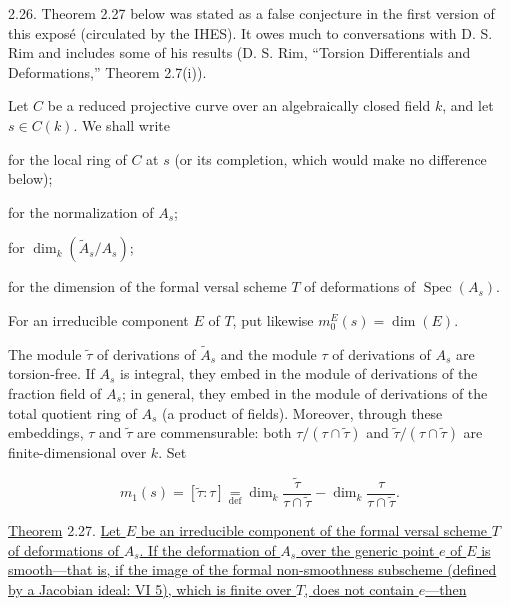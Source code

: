 2.26. Theorem 2.27 below was stated as a false conjecture in the first version
of this exposé (circulated by the IHES).  It owes much to conversations with
D. S. Rim and includes some of his results (D. S. Rim, ``Torsion
Differentials and Deformations,'' Theorem 2.7(i)).


Let $C$ be a reduced projective curve over an algebraically closed field $k$,
and let $s\in C(k)$.  We shall write

\begin{description}[leftmargin=2.7cm,style=nextline]
\item[$A_s$] for the local ring of $C$ at $s$ (or its completion, which would
make no difference below);
\item[$\widetilde A_s$] for the normalization of $A_s$;
\item[$\delta(s)$] for $\dim_k(\widetilde A_s/A_s)$;
\item[$m_0(s)$] for the dimension of the formal versal scheme $T$ of
deformations of $\operatorname{Spec}(A_s)$.
\end{description}

For an irreducible component $E$ of $T$, put likewise
$m_0^E(s)=\dim(E)$.

The module $\widetilde\tau$ of derivations of $\widetilde A_s$ and the module
$\tau$ of derivations of $A_s$ are torsion-free.  If $A_s$ is integral, they
embed in the module of derivations of the fraction field of $A_s$; in general,
they embed in the module of derivations of the total quotient ring of $A_s$
(a product of fields).  Moreover, through these embeddings, $\tau$ and
$\widetilde\tau$ are commensurable: both
$\tau/(\tau\cap\widetilde\tau)$ and
$\widetilde\tau/(\tau\cap\widetilde\tau)$ are finite-dimensional over $k$.
Set

\begin{equation*}
m_1(s)=[\widetilde\tau:\tau]
\mathrel{\mathop=\limits_{\mathrm{def}}}
\dim_k\frac{\widetilde\tau}{\tau\cap\widetilde\tau}
-\dim_k\frac{\tau}{\tau\cap\widetilde\tau}.
\end{equation*}

\underline{Theorem} 2.27. \underline{Let $E$ be an irreducible component of
the formal versal scheme $T$ of deformations of $A_s$. If the deformation of
$A_s$ over the generic point $e$ of $E$ is smooth---that is, if the image of
the formal non-smoothness subscheme (defined by a Jacobian ideal: VI 5), which
is finite over $T$, does not contain $e$---then}

